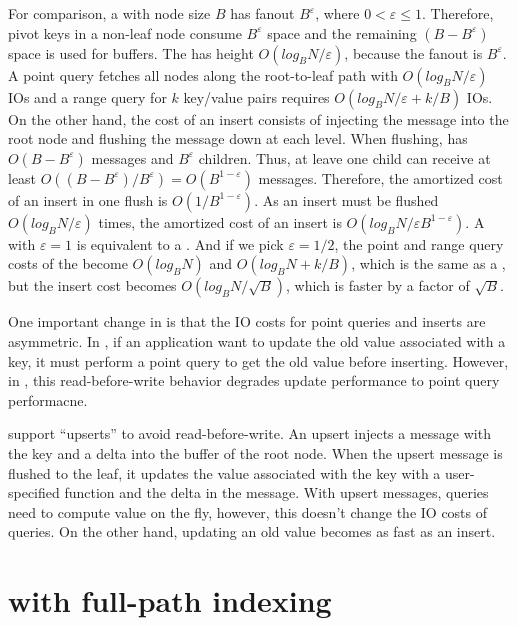 For comparison, a \bet with node size $B$ has fanout $B^{\varepsilon}$, where
$0 < \varepsilon \leq 1$.
Therefore, pivot keys in a non-leaf node consume $B^{\varepsilon}$ space and
the remaining $(B - B^{\varepsilon})$ space is used for buffers.
The \bet has height $O(log_{B}{N}/\varepsilon)$, because the fanout is
$B^{\varepsilon}$.
A point query fetches all nodes along the root-to-leaf path with
$O(log_{B}{N}/\varepsilon)$ IOs and a range query for $k$ key/value pairs
requires $O({log_{B}{N}}/{\varepsilon} + k/B)$ IOs.
On the other hand, the cost of an insert consists of injecting the message into
the root node and flushing the message down at each level.
When flushing, \bets has $O(B - B^{\varepsilon})$ messages and $B^{\varepsilon}$
children.
Thus, at leave one child can receive at least
$O((B - B^{\varepsilon})/B^{\varepsilon}) = O(B^{1 - \varepsilon})$ messages.
Therefore, the amortized cost of an insert in one flush is
$O(1/B^{1 - \varepsilon})$.
As an insert must be flushed $O(log_{B}{N}/\varepsilon)$ times, the amortized
cost of an insert is $O({log_{B}{N}}/{\varepsilon B^{1 - \varepsilon}})$.
A \bet with $\varepsilon = 1$ is equivalent to a \btree.
And if we pick $\varepsilon = 1/2$, the point and range query costs of the \bet
become $O(log_{B}{N})$ and $O(log_{B}{N} + k/B)$, which is the same as a \btree,
but the insert cost becomes $O(log_{B}{N}/{\sqrt{B}})$, which is faster by a
factor of $\sqrt{B}$.

One important change in \bets is that the IO costs for point queries and inserts
are asymmetric.
In \btrees, if an application want to update the old value associated with a
key, it must perform a point query to get the old value before inserting.
However, in \bets, this read-before-write behavior degrades update
performance to point query performacne.

\bets support ``upserts'' to avoid read-before-write.
An upsert injects a message with the key and a delta into the buffer of the root
node.
When the upsert message is flushed to the leaf, it updates the value associated
with the key with a user-specified function and the delta in the message.
With upsert messages, queries need to compute value on the fly, however, this
doesn't change the IO costs of queries.
On the other hand, updating an old value becomes as fast as an insert.

\section{\betrfs with full-path indexing}
\label{sec:fpi}

